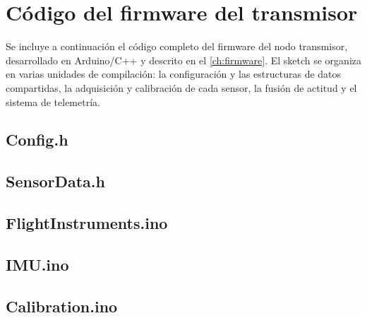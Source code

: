 

\chapter{Código del firmware del transmisor}
\label{anexo:fw_tx}

Se incluye a continuación el código completo del firmware del nodo transmisor,
desarrollado en Arduino/C++ y descrito en el \cref{ch:firmware}. El sketch se
organiza en varias unidades de compilación: la configuración y las estructuras de
datos compartidas, la adquisición y calibración de cada sensor, la fusión de
actitud y el sistema de telemetría.

\section{Config.h}


\section{SensorData.h}


\section{FlightInstruments.ino}


\section{IMU.ino}


\section{Calibration.ino}


